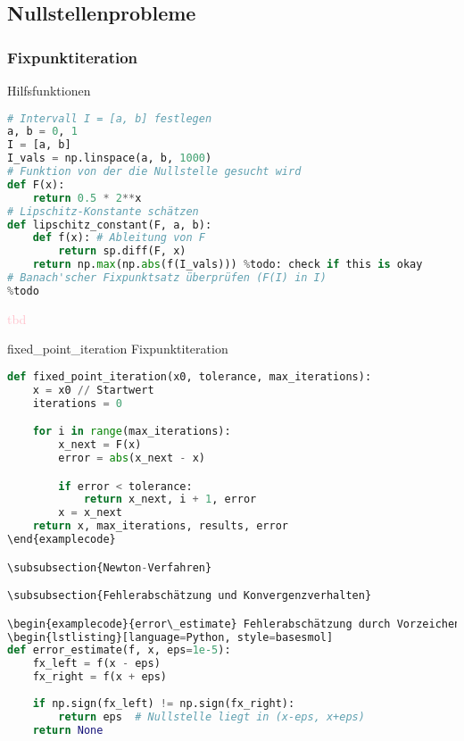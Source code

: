 \subsection{Nullstellenprobleme}

\subsubsection{Fixpunktiteration}

\begin{examplecode}{Hilfsfunktionen}
\begin{lstlisting}[language=Python, style=basesmol]
# Intervall I = [a, b] festlegen
a, b = 0, 1
I = [a, b]
I_vals = np.linspace(a, b, 1000)
# Funktion von der die Nullstelle gesucht wird
def F(x): 
    return 0.5 * 2**x
# Lipschitz-Konstante schätzen
def lipschitz_constant(F, a, b):
    def f(x): # Ableitung von F
        return sp.diff(F, x)
    return np.max(np.abs(f(I_vals))) %todo: check if this is okay
# Banach'scher Fixpunktsatz überprüfen (F(I) in I)
%todo

\end{lstlisting}

\textcolor{pink}{tbd}
\end{examplecode}


\begin{examplecode}{fixed\_point\_iteration} Fixpunktiteration
\begin{lstlisting}[language=Python, style=basesmol]
def fixed_point_iteration(x0, tolerance, max_iterations):
    x = x0 // Startwert
    iterations = 0

    for i in range(max_iterations):
        x_next = F(x)
        error = abs(x_next - x)

        if error < tolerance:
            return x_next, i + 1, error
        x = x_next
    return x, max_iterations, results, error
\end{examplecode}

\subsubsection{Newton-Verfahren}

\subsubsection{Fehlerabschätzung und Konvergenzverhalten}

\begin{examplecode}{error\_estimate} Fehlerabschätzung durch Vorzeichenwechsel
\begin{lstlisting}[language=Python, style=basesmol]
def error_estimate(f, x, eps=1e-5):
    fx_left = f(x - eps)
    fx_right = f(x + eps)
    
    if np.sign(fx_left) != np.sign(fx_right):
        return eps  # Nullstelle liegt in (x-eps, x+eps)
    return None
\end{lstlisting}
\end{examplecode}